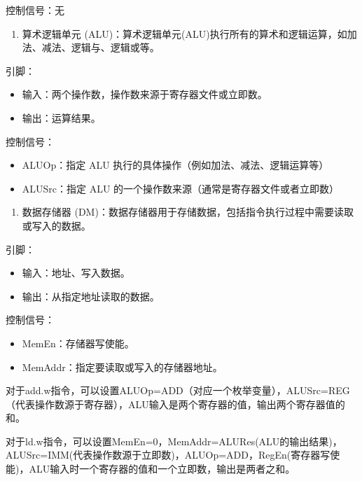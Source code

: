 控制信号：无

\begin{enumerate}
\def\labelenumi{\arabic{enumi}.}
\setcounter{enumi}{1}
\tightlist
\item
  算术逻辑单元 (ALU)：算术逻辑单元(ALU)执行所有的算术和逻辑运算，如加法、减法、逻辑与、逻辑或等。
\end{enumerate}

引脚：

\begin{itemize}
\item
  输入：两个操作数，操作数来源于寄存器文件或立即数。
\item
  输出：运算结果。
\end{itemize}

控制信号：

\begin{itemize}
\item
  ALUOp：指定 ALU 执行的具体操作（例如加法、减法、逻辑运算等）
\item
  ALUSrc：指定 ALU 的一个操作数来源（通常是寄存器文件或者立即数）
\end{itemize}

\begin{enumerate}
\def\labelenumi{\arabic{enumi}.}
\setcounter{enumi}{2}
\tightlist
\item
  数据存储器 (DM)：数据存储器用于存储数据，包括指令执行过程中需要读取或写入的数据。
\end{enumerate}

引脚：

\begin{itemize}
\item
  输入：地址、写入数据。
\item
  输出：从指定地址读取的数据。
\end{itemize}

控制信号：

\begin{itemize}
\item
  MemEn：存储器写使能。
\item
  MemAddr：指定要读取或写入的存储器地址。
\end{itemize}

对于add.w指令，可以设置ALUOp=ADD（对应一个枚举变量），ALUSrc=REG（代表操作数源于寄存器），ALU输入是两个寄存器的值，输出两个寄存器值的和。

对于ld.w指令，可以设置MemEn=0，MemAddr=ALURes(ALU的输出结果)，ALUSrc=IMM(代表操作数源于立即数)，ALUOp=ADD，RegEn(寄存器写使能)，ALU输入时一个寄存器的值和一个立即数，输出是两者之和。

